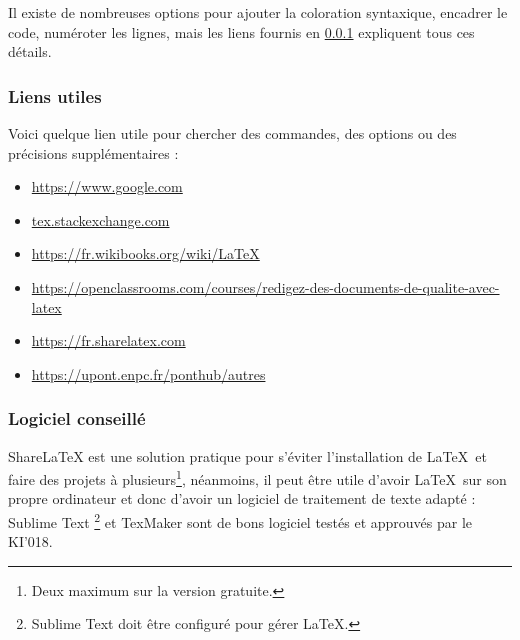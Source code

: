 \documentclass[11pt]{article}				%
\begin{document}
\noindent Il existe de nombreuses options pour ajouter la coloration syntaxique, encadrer le code, numéroter les lignes, mais les liens fournis en \ref{lien} expliquent tous ces détails.


\subsubsection{Liens utiles}\label{lien}


\noindent Voici quelque lien utile pour chercher des commandes, des options ou des précisions supplémentaires :
\begin{itemize}
	\item \url{https://www.google.com}
	\item \url{tex.stackexchange.com}
	\item \url{https://fr.wikibooks.org/wiki/LaTeX}
	\item \url{https://openclassrooms.com/courses/redigez-des-documents-de-qualite-avec-latex}
	\item \url{https://fr.sharelatex.com}
	\item \url{https://upont.enpc.fr/ponthub/autres}
\end{itemize}


\subsubsection{Logiciel conseillé}


\noindent ShareLaTeX est une solution pratique pour s'éviter l'installation de \LaTeX \ et faire des projets à plusieurs\footnote{Deux maximum sur la version gratuite.}, néanmoins, il peut être utile d'avoir \LaTeX \ sur son propre ordinateur et donc d'avoir un logiciel de traitement de texte adapté : Sublime Text \footnote{Sublime Text doit être configuré pour gérer \LaTeX.} et TexMaker sont de bons logiciel testés et approuvés par le KI'018.
\end{document}
